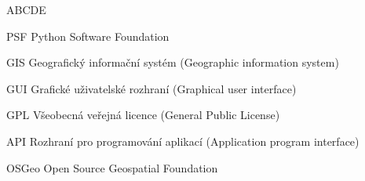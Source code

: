 
\begin{seznamzkratek}{ABCDE}      
	      
		  {PSF}
	      {Python Software Foundation}

	      {GIS}
	      {Geografický informační systém (Geographic information system)}
	         
	      {GUI}
	      {Grafické uživatelské rozhraní (Graphical user interface)}

	      {GPL}
	      {Všeobecná veřejná licence (General Public License)}
	      
	      {API}
	      {Rozhraní pro programování aplikací (Application program interface)}	      
	    
	      {OSGeo}
	      {Open Source Geospatial Foundation} 
  

\end{seznamzkratek}